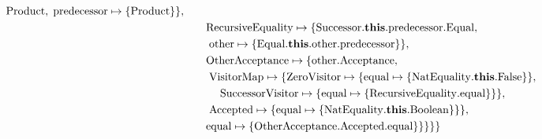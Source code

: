 {\begin{align*}
              \mathrm{Product},\;
            \mathrm{predecessor} \mapsto \{\mathrm{Product}\}\},\\
            &\qquad
            \mathrm{RecursiveEquality} \mapsto \{
              \mathrm{Successor}.\mathbf{this}.\mathrm{predecessor}.\mathrm{Equal},\\
              &\qquad\;
              \mathrm{other} \mapsto \{
            \mathrm{Equal}.\mathbf{this}.\mathrm{other}.\mathrm{predecessor}\}\},\\
            &\qquad
            \mathrm{OtherAcceptance} \mapsto \{
              \mathrm{other}.\mathrm{Acceptance},\\
              &\qquad\;
              \mathrm{VisitorMap} \mapsto \{
                \mathrm{ZeroVisitor} \mapsto \{
                  \mathrm{equal} \mapsto \{
                \mathrm{NatEquality}.\mathbf{this}.\mathrm{False}\}\},\\
                &\qquad\;\quad
                \mathrm{SuccessorVisitor} \mapsto \{
                  \mathrm{equal} \mapsto \{
              \mathrm{RecursiveEquality}.\mathrm{equal}\}\}\},\\
              &\qquad\;
              \mathrm{Accepted} \mapsto \{
                \mathrm{equal} \mapsto \{
            \mathrm{NatEquality}.\mathbf{this}.\mathrm{Boolean}\}\}\},\\
            &\qquad
            \mathrm{equal} \mapsto \{
    \mathrm{OtherAcceptance}.\mathrm{Accepted}.\mathrm{equal}\}\}\}\}\}
\end{align*}}
